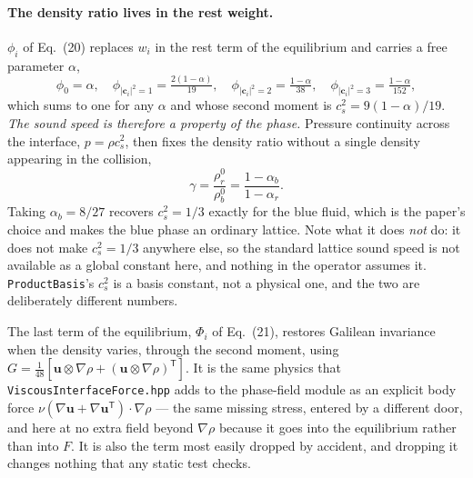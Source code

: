 \documentclass[11pt,a4paper]{article}
\newcommand{\code}[1]{\texttt{\small #1}}
\newcommand{\cs}{c_s}
\newcommand{\ci}{\bm{c}_i}
\newcommand{\uu}{\bm{u}}
\begin{document}
\paragraph{The density ratio lives in the rest weight.} $\phi_i$ of Eq.~(20)
replaces $w_i$ in the rest term of the equilibrium and carries a free parameter
$\alpha$,
\begin{equation}
  \phi_0 = \alpha, \quad
  \phi_{|\ci|^2=1} = \tfrac{2(1-\alpha)}{19}, \quad
  \phi_{|\ci|^2=2} = \tfrac{1-\alpha}{38}, \quad
  \phi_{|\ci|^2=3} = \tfrac{1-\alpha}{152},
\end{equation}
which sums to one for any $\alpha$ and whose second moment is
$\cs^2 = 9(1-\alpha)/19$. \emph{The sound speed is therefore a property of the
phase.} Pressure continuity across the interface, $p = \rho\cs^2$, then fixes
the density ratio without a single density appearing in the collision,
\begin{equation}
  \gamma = \frac{\rho_r^0}{\rho_b^0} = \frac{1-\alpha_b}{1-\alpha_r}.
  \label{eq:cgratio}
\end{equation}
Taking $\alpha_b = 8/27$ recovers $\cs^2 = 1/3$ exactly for the blue fluid,
which is the paper's choice and makes the blue phase an ordinary lattice. Note
what it does \emph{not} do: it does not make $\cs^2 = 1/3$ anywhere else, so the
standard lattice sound speed is not available as a global constant here, and
nothing in the operator assumes it. \code{ProductBasis}'s $\cs^2$ is a basis
constant, not a physical one, and the two are deliberately different numbers.

The last term of the equilibrium, $\Phi_i$ of Eq.~(21), restores Galilean
invariance when the density varies, through the second moment, using
$G = \tfrac{1}{48}[\uu \otimes \nabla\rho + (\uu \otimes \nabla\rho)^{\mathsf T}]$.
It is the same physics that \code{ViscousInterfaceForce.hpp} adds to the
phase-field module as an explicit body force
$\nu(\nabla\uu + \nabla\uu^{\mathsf T})\cdot\nabla\rho$ --- the same missing
stress, entered by a different door, and here at no extra field beyond
$\nabla\rho$ because it goes into the equilibrium rather than into $F$. It is
also the term most easily dropped by accident, and dropping it changes nothing
that any static test checks.
\end{document}

